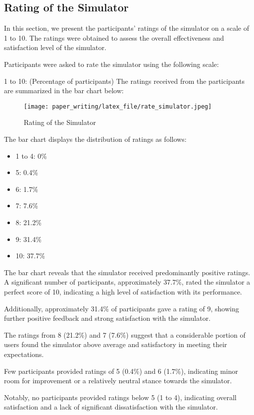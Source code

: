 \documentclass[conference]{/home/habib/Desktop/flash_ssd_simulator_web/paper_writing/latex_file/IEEEtran}
\begin{document}
\subsection{Rating of the Simulator}
In this section, we present the participants' ratings of the simulator on a scale of 1 to 10. The ratings were obtained to assess the overall effectiveness and satisfaction level of the simulator.

Participants were asked to rate the simulator using the following scale:

1 to 10: (Percentage of participants)
The ratings received from the participants are summarized in the bar chart below:
\begin{figure}[h]
    \centering
    \texttt{[image: paper\_writing/latex\_file/rate\_simulator.jpeg]}
    \caption{Rating of the Simulator}
    \label{fig:enter-label}
\end{figure}
The bar chart displays the distribution of ratings as follows:
\begin{itemize}
    \item 1 to 4: 0\%
    \item 5: 0.4\%
    \item 6: 1.7\%
    \item 7: 7.6\%
    \item 8: 21.2\%
    \item 9: 31.4\%
    \item 10: 37.7\%
\end{itemize}
The bar chart reveals that the simulator received predominantly positive ratings. A significant number of participants, approximately 37.7\%, rated the simulator a perfect score of 10, indicating a high level of satisfaction with its performance.

Additionally, approximately 31.4\% of participants gave a rating of 9, showing further positive feedback and strong satisfaction with the simulator.

The ratings from 8 (21.2\%) and 7 (7.6\%) suggest that a considerable portion of users found the simulator above average and satisfactory in meeting their expectations.

Few participants provided ratings of 5 (0.4\%) and 6 (1.7\%), indicating minor room for improvement or a relatively neutral stance towards the simulator.

Notably, no participants provided ratings below 5 (1 to 4), indicating overall satisfaction and a lack of significant dissatisfaction with the simulator.
\end{document}
